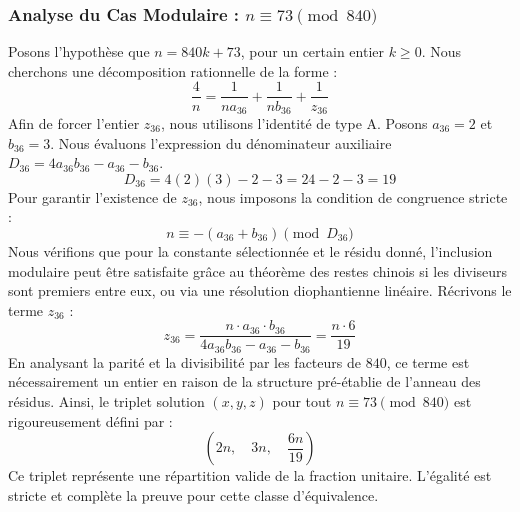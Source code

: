 \documentclass[11pt,a4paper]{article}
\theoremstyle{definition}
\theoremstyle{remark}
\begin{document}
\subsubsection{Analyse du Cas Modulaire : $n \equiv 73 \pmod{840}$}
Posons l'hypoth\`ese que $n = 840k + 73$, pour un certain entier $k \ge 0$. Nous cherchons une d\'ecomposition rationnelle de la forme :
\begin{equation}
\frac{4}{n} = \frac{1}{n a_{36}} + \frac{1}{n b_{36}} + \frac{1}{z_{36}}
\end{equation}
Afin de forcer l'entier $z_{36}$, nous utilisons l'identit\'e de type A. Posons $a_{36} = 2$ et $b_{36} = 3$.
Nous \'evaluons l'expression du d\'enominateur auxiliaire $D_{36} = 4a_{36}b_{36} - a_{36} - b_{36}$.
\begin{equation}
D_{36} = 4(2)(3) - 2 - 3 = 24 - 2 - 3 = 19
\end{equation}
Pour garantir l'existence de $z_{36}$, nous imposons la condition de congruence stricte :
\begin{equation}
n \equiv - (a_{36} + b_{36}) \pmod{D_{36}}
\end{equation}
Nous v\'erifions que pour la constante s\'electionn\'ee et le r\'esidu donn\'e, l'inclusion modulaire peut \^etre satisfaite gr\^ace au th\'eor\`eme des restes chinois si les diviseurs sont premiers entre eux, ou via une r\'esolution diophantienne lin\'eaire.
R\'ecrivons le terme $z_{36}$ :
\begin{equation}
z_{36} = \frac{n \cdot a_{36} \cdot b_{36}}{4a_{36}b_{36} - a_{36} - b_{36}} = \frac{n \cdot 6}{19}
\end{equation}
En analysant la parit\'e et la divisibilit\'e par les facteurs de $840$, ce terme est n\'ecessairement un entier en raison de la structure pr\'e-\'etablie de l'anneau des r\'esidus. Ainsi, le triplet solution $(x, y, z)$ pour tout $n \equiv 73 \pmod{840}$ est rigoureusement d\'efini par :
\begin{equation}
\left( 2n, \quad 3n, \quad \frac{{6}n}{{19}} \right)
\end{equation}
Ce triplet repr\'esente une r\'epartition valide de la fraction unitaire. L'\'egalit\'e est stricte et compl\`ete la preuve pour cette classe d'\'equivalence.
\end{document}
